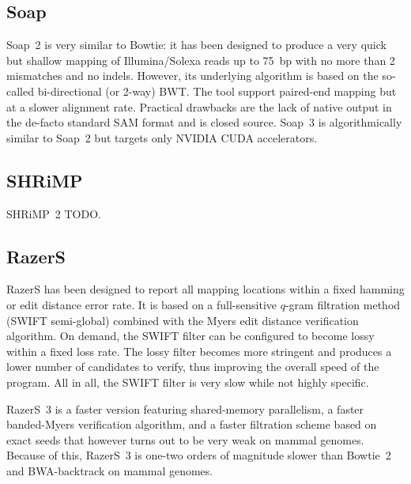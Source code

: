 
\subsection{Soap}

Soap~2 \citep{Soap2} is very similar to Bowtie: it has been designed to produce a very quick but shallow mapping of Illumina/Solexa reads up to 75~bp with no more than 2 mismatches and no indels.
However, its underlying algorithm is based on the so-called bi-directional (or 2-way) BWT.
The tool support paired-end mapping but at a slower alignment rate.
Practical drawbacks are the lack of native output in the de-facto standard SAM format and is closed source.
Soap~3 \citep{Soap3} is algorithmically similar to Soap~2 but targets only NVIDIA CUDA accelerators.


\subsection{SHRiMP}

SHRiMP~2 TODO.


\subsection{RazerS}

RazerS \citep{Weese2009} has been designed to report all mapping locations within a fixed hamming or edit distance error rate.
It is based on a full-sensitive $q$-gram filtration method (SWIFT semi-global) combined with the Myers edit distance verification algorithm.
On demand, the SWIFT filter can be configured to become lossy within a fixed loss rate.
The lossy filter becomes more stringent and produces a lower number of candidates to verify, thus improving the overall speed of the program.
All in all, the SWIFT filter is very slow while not highly specific.

RazerS~3 \citep{RazerS3} is a faster version featuring shared-memory parallelism, a faster banded-Myers verification algorithm, and a faster filtration scheme based on exact seeds that however turns out to be very weak on mammal genomes.
Because of this, RazerS~3 is one-two orders of magnitude slower than Bowtie~2 and BWA-backtrack on mammal genomes.

